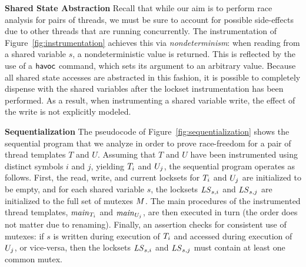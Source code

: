 \noindent\textbf{Shared State Abstraction }
%
Recall that while our aim is to perform race analysis for pairs of threads, we must be sure to account for possible side-effects due to other threads that are running concurrently.  The instrumentation of Figure~\ref{fig:instrumentation} achieves this via \emph{nondeterminism}: when reading from a shared variable $s$, a nondeterministic value is returned.  This is reflected by the use of a $\mathsf{havoc}$ command, which sets its argument to an arbitrary value.  Because all shared state accesses are abstracted in this fashion, it is possible to completely dispense with the shared variables after the lockset instrumentation has been performed.  As a result, when instrumenting a shared variable write, the effect of the write is not explicitly modeled.

\noindent\textbf{Sequentialization }
%
The pseudocode of Figure~\ref{fig:sequentialization} shows the sequential program that we analyze in order to prove race-freedom for a pair of thread templates $T$ and $U$. Assuming that $T$ and $U$ have been instrumented using distinct symbols $i$ and $j$, yielding $T_{i}$ and $U_{j}$, the sequential program operates as follows. First, the read, write, and current locksets for $T_{i}$ and $U_{j}$ are initialized to be empty, and for each shared variable $s$, the locksets $\mathit{LS}_{s,i}$ and $\mathit{LS}_{s,j}$ are initialized to the full set of mutexes $M$.  The main procedures of the instrumented thread templates, $\mathit{main}_{T_{i}}$ and $\mathit{main}_{U_{j}}$, are then executed in turn (the order does not matter due to renaming). Finally, an assertion checks for consistent use of mutexes: if $s$ is written during execution of $T_{i}$ and accessed during execution of $U_{j}$, or vice-versa, then the locksets $\mathit{LS}_{s,i}$ and $\mathit{LS}_{s,j}$ must contain at least one common mutex.

